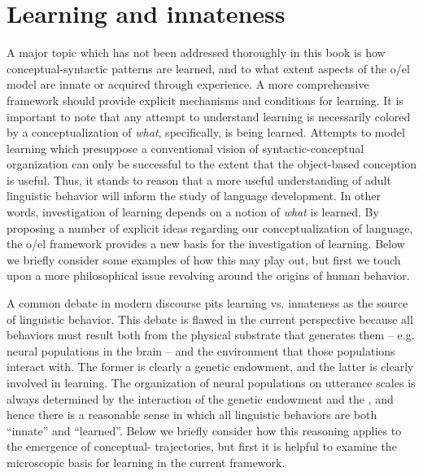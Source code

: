 \section{Learning and innateness}

A major topic which has not been addressed thoroughly in this book is how conceptual-syntactic patterns are learned, and to what extent aspects of the o/el model are innate or acquired through experience. A more comprehensive framework should provide explicit mechanisms and conditions for learning. It is important to note that any attempt to understand learning is necessarily colored by a conceptualization of \textit{what}, specifically, is being learned. Attempts to model learning which presuppose a conventional vision of syntactic-conceptual organization can only be successful to the extent that the object-based conception is useful. Thus, it stands to reason that a more useful understanding of adult linguistic behavior will inform the study of language development. In other words, investigation of learning depends on a notion of \textit{what} is learned. By proposing a number of explicit ideas regarding our conceptualization of language, the o/el framework provides a new basis for the investigation of learning. Below we briefly consider some examples of how this may play out, but first we touch upon a more philosophical issue revolving around the origins of human behavior.

A common debate in modern discourse pits learning vs. innateness as the source of linguistic behavior. This debate is flawed in the current perspective because all behaviors must result both from the physical substrate that generates them -- e.g. neural populations in the brain -- and the environment that those populations interact with. The former is clearly a genetic endowment, and the latter is clearly involved in learning. The organization of neural populations on utterance scales is always determined by the interaction of the genetic endowment and the , and hence there is a reasonable sense in which all linguistic behaviors are both “innate” and “learned”.  Below we briefly consider how this reasoning applies to the emergence of conceptual- trajectories, but first it is helpful to examine the microscopic basis for learning in the current framework.

